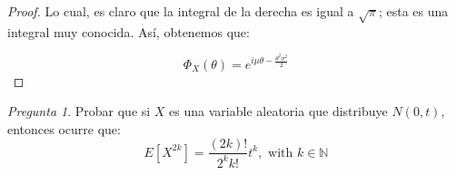 \documentclass[11pt]{article}
\theoremstyle{definition}
\theoremstyle{remark}
\theoremstyle{remark}
\newtheorem{question}{Pregunta}
\newcommand{\N}{\mathbb{N}}
\begin{document}
\begin{proof}
  Lo cual, es claro que la integral de la derecha es igual a
  $\sqrt{\pi}$; esta es una integral muy conocida. Así, obtenemos
  que:

  \begin{equation*}
    \Phi_X(\theta) = e^{i\mu\theta -\frac{\theta^2\sigma^2}{2}}
  \end{equation*}
\end{proof}

\begin{question}
  Probar que si $X$ es una variable aleatoria que distribuye
  $N(0, t)$, entonces ocurre que:
  \begin{equation*}
    E\left[X^{2k}\right] = \frac{(2k)!}{2^kk!}t^k, \text{ with }
    k \in \N
  \end{equation*}
\end{question}
\end{document}

